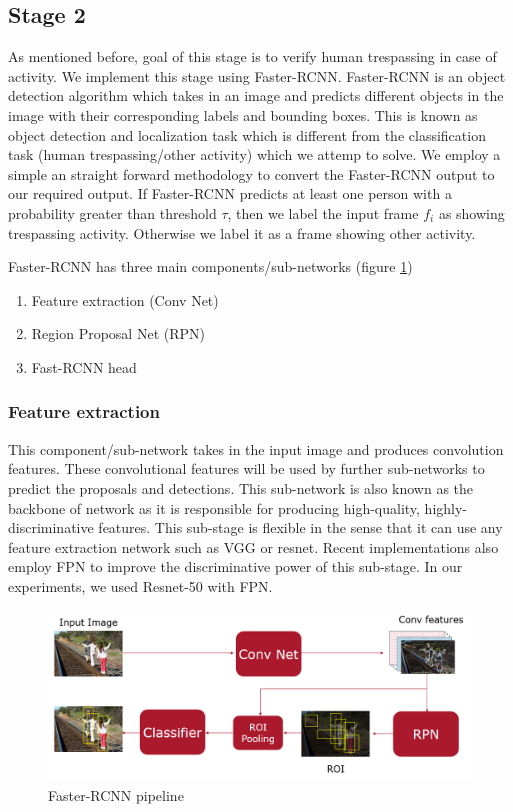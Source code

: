 \subsection{Stage 2 }
As mentioned before, goal of this stage is to verify human trespassing in case of activity. We implement this stage using Faster-RCNN\cite{ref_fasterrcnn}. Faster-RCNN is an object detection algorithm which takes in an image and predicts different objects in the image with their corresponding labels and bounding boxes. This is known as object detection and localization task which is different from the classification task (human trespassing/other activity) which we attemp to solve. We employ a simple an straight forward methodology to convert the Faster-RCNN output to our required output. If Faster-RCNN predicts at least one person with a probability greater than threshold $\tau$, then we label the input frame $f_i$ as showing trespassing activity. Otherwise we label it as a frame showing other activity. 

Faster-RCNN has three main components/sub-networks (figure \ref{fig:faster-rcnn-pipeline})
\begin{enumerate}
    \item Feature extraction (Conv Net)
    \item Region Proposal Net (RPN)
    \item Fast-RCNN head
\end{enumerate}

\subsubsection{Feature extraction}
This component/sub-network takes in the input image and produces convolution features. These convolutional features will be used by further sub-networks to predict the proposals and detections. This sub-network is also known as the backbone of network as it is responsible for producing high-quality, highly-discriminative features. This sub-stage is flexible in the sense that it can use any feature extraction network such as VGG or resnet. Recent implementations also employ FPN\cite{lin2017feature} to improve the discriminative power of this sub-stage. In our experiments, we used Resnet-50 with FPN. 

\begin{figure}
    \centering
    \includegraphics[width=\linewidth]{images/faster-rcnn-pipeline.PNG}
    \caption[Faster-RCNN pipeline]{Faster-RCNN pipeline}
    \label{fig:faster-rcnn-pipeline}
\end{figure}


